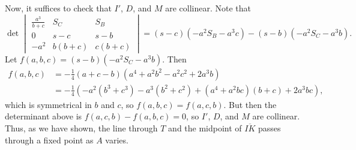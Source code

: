 Now, it suffices to check that $I'$, $D$, and $M$ are collinear. Note that \[\det{\begin{vmatrix}\frac{a^3}{b+c}&S_C&S_B\\0&s-c&s-b\\-a^2&b\left(b+c\right)&c\left(b+c\right)\end{vmatrix}}=\left(s-c\right)\left(-a^2S_B-a^3c\right)-\left(s-b\right)\left(-a^2S_C-a^3b\right).\] Let $f\left(a,b,c\right)=\left(s-b\right)\left(-a^2S_C-a^3b\right)$. Then \begin{align*}f\left(a,b,c\right)&=-\frac{1}{4}\left(a+c-b\right)\left(a^4+a^2b^2-a^2c^2+2a^3b\right)\\&=-\frac{1}{4}\left(-a^2\left(b^3+c^3\right)-a^3\left(b^2+c^2\right)+\left(a^4+a^2bc\right)\left(b+c\right)+2a^3bc\right),\end{align*} which is symmetrical in $b$ and $c$, so $f\left(a,b,c\right)=f\left(a,c,b\right)$. But then the determinant above is $f\left(a,c,b\right)-f\left(a,b,c\right)=0$, so $I'$, $D$, and $M$ are collinear. Thus, as we have shown, the line through $T$ and the midpoint of $\overline{IK}$ passes through a fixed point as $A$ varies.